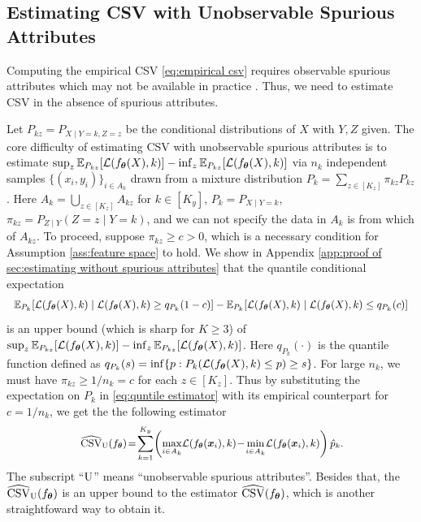 \documentclass{article} %
\newcommand{\btheta}{\text{\boldmath{$\theta$}}}
\newcommand{\bx}{\boldsymbol{x}}
\newcommand{\mE}{\mathbb{E}}
\newcommand{\cL}{\mathcal{L}}
\begin{document}
	\subsection{Estimating CSV with Unobservable Spurious Attributes}\label{sec:estimating without spurious attributes}
	Computing the empirical CSV \eqref{eq:empirical csv} requires observable spurious attributes which may not be available in practice \citep{liu2021just}. Thus, we need to estimate CSV in the absence of spurious attributes.
	\par
	Let $P_{kz} = P_{X\mid Y = k, Z = z}$ be the conditional distributions of $X$ with $Y, Z$ given. The core difficulty of estimating CSV with unobservable spurious attributes is to estimate $\sup_{z}{\mE}_{P_{kz}}[\cL(f_{\btheta}(X), k)] - \inf_{z}{\mE}_{P_{kz}}[\cL(f_{\btheta}(X), k)]$
	via $n_{k}$ independent samples $\{(x_{i}, y_{i})\}_{i\in A_{k}}$ drawn from a mixture distribution $P_{k} = \sum_{z\in[K_{z}]}\pi_{kz}P_{kz}$. Here  $A_{k}=\bigcup_{z\in[K_{z}]}A_{kz}$ for $k\in[K_{y}]$, $P_{k} = P_{X\mid Y=k}$, $\pi_{kz} = P_{Z\mid Y}(Z = z \mid Y = k)$, and we can not specify the data in $A_{k}$ is from which of $A_{kz}$. To proceed, suppose $\pi_{kz} \geq c > 0$, which is a necessary condition for Assumption \ref{ass:feature space} to hold. We show in Appendix \ref{app:proof of sec:estimating without spurious attributes} that the quantile conditional expectation 
	\begin{equation}\label{eq:quntile estimator}
		\small
		\begin{aligned}
			\mE_{P_{k}}[\cL(f_{\btheta}(X), k)\mid \cL(f_{\btheta}(X), k)\geq q_{P_{k}}(1 - c)] - \mE_{P_{k}}[\cL(f_{\btheta}(X), k)\mid \cL(f_{\btheta}(X), k)\leq q_{P_{k}}(c)]
		\end{aligned}
	\end{equation}
	is an upper bound (which is sharp for $K \geq 3$) of $\sup_{z}{\mE}_{P_{kz}}[\cL(f_{\btheta}(X), k)] - \inf_{z}{\mE}_{P_{kz}}[\cL(f_{\btheta}(X), k)]$. Here $q_{P_{k}}(\cdot)$ is the quantile function defined as $q_{P_{k}}(s) = \inf\{p: P_{k}(\cL(f_{\btheta}(X), k) \leq p) \geq s\}$. For large $n_{k}$, we must have $\pi_{kz}\geq 1/n_{k} = c$ for each $z\in[K_{z}]$. Thus by substituting the expectation on $P_{k}$ in \eqref{eq:quntile estimator} with its empirical counterpart for $c = 1/n_{k}$, we get the the following estimator
	\begin{equation}\label{eq:estimator without spurious attribute}
		\small
		\widehat{\rm{CSV}}_{\rm U}(f_{\btheta}) \!= \!\sum_{k=1}^{K_{y}}\!\left(\max_{i\in A_{k}}\!\cL(f_{\btheta}(\bx_{i}), k) \! - \!\min_{i\in A_{k}}\!\cL(f_{\btheta}(\bx_{i}), k)\right)\hat{p}_{k}. \!
	\end{equation}
	The subscript ``$\rm U$'' means ``unobservable spurious attributes''. Besides that, the $\widehat{\rm{CSV}}_{\rm U}(f_{\btheta})$ is an upper bound to the estimator 
	$\widehat{\rm{CSV}}(f_{\btheta})$, which is another straightfoward way to obtain it.
	
\end{document}
